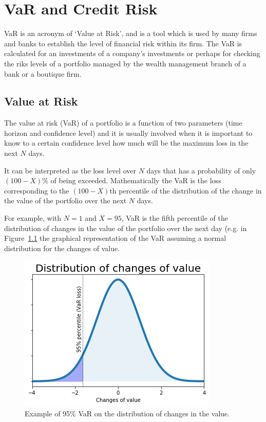 \chapter{VaR and Credit Risk}\label{var-and-credit-risk}

VaR is an acronym of ‘Value at Risk’, and is a tool which is used by many firms and banks to establish the level of financial risk within its firm. The VaR is calculated for an investments of a company’s investments or perhaps for checking the riks levels of a portfolio managed by the wealth management branch of a bank or a boutique firm.

\section{Value at Risk}\label{value-at-risk}

The value at risk (VaR) of a portfolio is a function of two parameters
(time horizon and confidence level) and it is usually involved when it
is important to know to a certain confidence level how
much will be the maximum loss in the next $N$ days. 

It can be interpreted as the loss level over \(N\) days that has a 
probability of only \((100 - X)\%\) of being exceeded.
Mathematically the VaR is the loss corresponding to the
\((100-X)\textrm{th}\) percentile of the distribution of the change in
the value of the portfolio over the next \(N\) days. 

For example, with \(N=1\) and \(X=95\), VaR is the fifth percentile of the distribution of
changes in the value of the portfolio over the next day (e.g. in Figure~\ref{fig:var_loss}
the graphical representation of the VaR assuming a normal
distribution for the changes of value.

\begin{figure}
\centering
  \includegraphics[width=0.6\linewidth]{lecture_9_files/lecture_9_2_0.png}
  \caption{Example of 95\% VaR on the distribution of changes in the value.}
  \label{fig:var_loss}
\end{figure}
    
